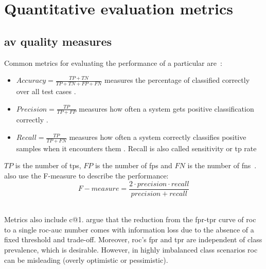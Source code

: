 \section{Quantitative evaluation metrics}

\subsection{\ac{av} quality measures}
\label{subsec:av_quality_measures}

Common metrics for evaluating the performance of a particular are~\citep{elmanarelbouanani_authorship_2014}:
\begin{itemize}
    \item $Accuracy = \frac{TP + TN}{TP + TN + FP + FN}$ \citep{elmanarelbouanani_authorship_2014,neal_surveying_2018} 
    measures the percentage of classified correctly over all test cases \citep{neal_surveying_2018}.

    \item $Precision = \frac{TP}{TP + FP}$ \citep{elmanarelbouanani_authorship_2014,neal_surveying_2018,chen_web_2008} 
    measures how often a system gets positive classification correctly \citep{neal_surveying_2018}.

    \item $Recall = \frac{TP}{TP + FN}$ \citep{elmanarelbouanani_authorship_2014,neal_surveying_2018,chen_web_2008} 
    measures how often a system correctly classifies positive samples when it encounters them \citep{neal_surveying_2018}.
    Recall is also called sensitivity or \acl{tp} rate \citep{palivela_optimization_2021}
\end{itemize}
$TP$ is the number of \aclp{tp}, $FP$ is the number of \aclp{fp} 
and $FN$ is the number of \aclp{fn}~\citep{chen_web_2008}.
\citet{chen_web_2008} also use the F-measure to describe the performance:
$$F-measure = \frac{2 \cdot precision \cdot recall}{precision + recall}$$~\citep{chen_web_2008,abbasi_writeprints_2008}


Metrics also include c@1.
\citet{llm_detection_av_2025} argue that the reduction from the \ac{fpr}-\ac{tpr} curve of \ac{roc} to a single \ac{roc-auc} number 
comes with information loss due to the absence of a fixed threshold and trade-off.
Moreover, \ac{roc}'s \ac{fpr} and \ac{tpr} are independent of class prevalence, which is desirable.
However, in highly imbalanced class scenarios \ac{roc} can be misleading (overly optimistic or pessimistic).

